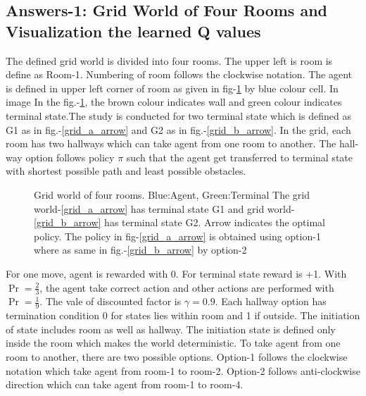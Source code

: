 \documentclass[preprint,12pt]{elsarticle}
\begin{document}
\subsection{Answers-1: Grid World of Four Rooms and Visualization the learned Q values}




The defined grid world is divided into four rooms. The upper left is room is define as Room-1. Numbering of room follows the clockwise notation. The agent is defined in upper left corner of room as given in fig-\ref{fig:grids} by blue colour cell. In image  In the fig.-\ref{fig:grids}, the brown colour indicates wall and green colour indicates terminal state.The study is conducted for two terminal state which is defined as G1 as in fig.-\ref{grid_a_arrow} and G2 as in fig.-\ref{grid_b_arrow}. In the grid, each room has two hallways which can take agent from one room to another. The hall-way option follows policy $\pi$ such that the agent get transferred to terminal state with shortest possible path and least possible obstacles. 


\begin{figure}[H]
	\centering  
	\caption{Grid world of four rooms.  Blue:Agent, Green:Terminal The grid world-\ref{grid_a_arrow} has terminal state G1 and grid world-\ref{grid_b_arrow} has terminal state G2. Arrow indicates the optimal policy. The policy in fig-\ref{grid_a_arrow} is obtained using option-1 where as same in fig.-\ref{grid_b_arrow} by option-2 }
	\label{fig:grids}
\end{figure}

For one move, agent is rewarded with 0. For terminal state reward is +1. With $\Pr = \frac{2}{3}$, the agent take correct action and other actions are performed with $\Pr = \frac{1}{9}$. The vale of discounted factor is $\gamma=0.9$. Each hallway option has termination condition 0 for states lies within room and 1 if outside. The initiation of state includes room as well as hallway. The initiation state is defined only inside the room which makes the world deterministic. To take agent from one room to another, there are two possible options. Option-1 follows the clockwise notation which take agent from room-1 to room-2. Option-2 follows anti-clockwise direction which can take agent from room-1 to room-4.
\end{document}

